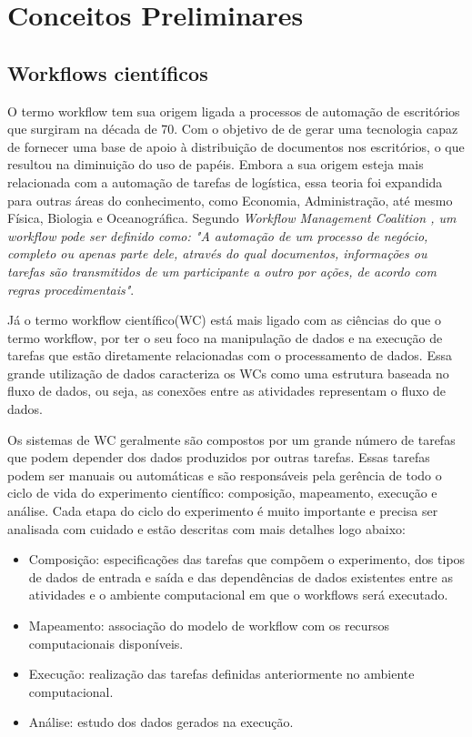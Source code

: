 \section{Conceitos Preliminares}
	\subsection{Workflows científicos}
		
		O termo workflow tem sua origem ligada a processos de automação de escritórios  que surgiram na década de 70. Com o objetivo de de gerar uma tecnologia capaz de fornecer uma base de apoio à distribuição de documentos nos escritórios, o que resultou na diminuição do uso de papéis\cite{Ogasawara2011}. Embora a sua origem esteja mais relacionada com a automação de tarefas de logística, essa teoria foi expandida para outras áreas do conhecimento, como Economia, Administração, até mesmo Física, Biologia e Oceanográfica. Segundo \textit{Workflow Management Coalition\cite{WfMC} , um workflow pode ser definido como: "A automação de um processo de negócio, completo ou apenas parte dele, através do qual documentos, informações ou tarefas são transmitidos de um participante a outro por ações, de acordo com regras procedimentais"}.

		Já o termo workflow científico(WC) está mais ligado com as ciências do que o termo workflow, por ter o seu foco na manipulação de dados e na execução de tarefas que estão diretamente relacionadas com o processamento de dados. Essa grande utilização de dados caracteriza os WCs como uma estrutura baseada no fluxo de dados, ou seja, as conexões entre as atividades representam o fluxo de dados.\cite{Teixeira2013}
		 
		Os sistemas de WC geralmente são compostos por um grande número de tarefas que podem depender dos dados produzidos por outras tarefas. Essas tarefas podem ser manuais ou automáticas e são responsáveis pela gerência de todo o ciclo de vida do experimento científico: composição, mapeamento, execução e análise. Cada etapa do ciclo do experimento é muito importante e precisa ser analisada com cuidado\cite{Junior2012} e estão descritas com mais detalhes logo abaixo:

	\begin{itemize}
		\item Composição: especificações das tarefas que compõem o experimento, dos tipos de dados de entrada e saída e das dependências de dados existentes entre as atividades e o ambiente computacional em que o workflows será executado.
		
		\item Mapeamento: associação do modelo de workflow com os recursos computacionais disponíveis.		
		
		\item Execução: realização das tarefas definidas anteriormente no ambiente computacional.

		\item Análise: estudo dos dados gerados na execução.

	\end{itemize}


